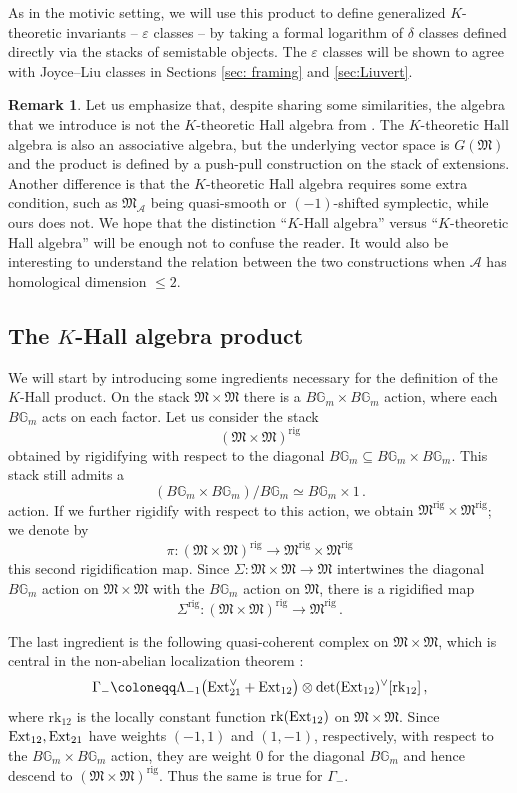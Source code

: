 \documentclass[12pt]{amsart}
\theoremstyle{definition}
\newtheorem{remark}[definition]{Remark}
\newcommand{\BG}{{\mathbb{G}}}
\newcommand{\CA}{{\mathcal A}}
\newcommand{\1}{\mathbf 1}
\newcommand{\FM}{{\mathfrak{M}}}
\newcommand{\Ext}{\mathcal{E}\text{xt}}
\newcommand{\rk}{\mathrm{rk}}
\newcommand{\rig}{\mathrm{rig}}
\renewcommand{\Ext}{\textup{Ext}}
\begin{document}
As in the motivic setting, we will use this product to define generalized $K$-theoretic invariants -- $\varepsilon$ classes -- by taking a formal logarithm of $\delta$ classes defined directly via the stacks of semistable objects. The $\varepsilon$ classes will be shown to agree with Joyce--Liu classes in Sections \ref{sec: framing} and \ref{sec:Liuvert}.


\begin{remark}
    Let us emphasize that, despite sharing some similarities, the algebra that we introduce is not the $K$-theoretic Hall algebra from \cite{tudorKHall}. The $K$-theoretic Hall algebra is also an associative algebra, but the underlying vector space is $G(\FM)$ and the product is defined by a push-pull construction on the stack of extensions. Another difference is that the $K$-theoretic Hall algebra requires some extra condition, such as $\FM_\CA$ being quasi-smooth or $(-1)$-shifted symplectic, while ours does not. We hope that the distinction ``$K$-Hall algebra'' versus ``$K$-theoretic Hall algebra'' will be enough not to confuse the reader. It would also be interesting to understand the relation between the two constructions when $\CA$ has homological dimension $\leq 2$. 
\end{remark}

\subsection{The $K$-Hall algebra product}\label{subsec: K-Hal-prod}

We will start by introducing some ingredients necessary for the definition of the $K$-Hall product. On the stack $\FM\times \FM$ there is a $B\BG_m\times B\BG_m$ action, where each $B\BG_m$ acts on each factor. Let us consider the stack
\[(\FM\times \FM)^\rig\]
obtained by rigidifying with respect to the diagonal $B\BG_m\subseteq B\BG_m\times B\BG_m$. This stack still admits a 
\[(B\BG_m\times B\BG_m)/B\BG_m\simeq B\BG_m\times 1\,.\]
action. If we further rigidify with respect to this action, we obtain $\FM^\rig\times \FM^\rig$; we denote by
\[\pi\colon (\FM\times \FM)^\rig \to \FM^\rig\times \FM^\rig \]
this second rigidification map. Since $\Sigma\colon \FM\times \FM\to \FM$ intertwines the diagonal $B\BG_m$ action on $\FM\times \FM$ with the $B\BG_m$ action on $\FM$, there is a rigidified map
\[\Sigma^\rig\colon (\FM\times \FM)^\rig\to \FM^\rig\,.\]

The last ingredient is the following quasi-coherent complex on $\FM\times \FM$, which is central in the non-abelian localization theorem \cite{TW, HLNAL}:
\begin{equation}
    \label{eq: gammacomplex}
\Gamma_-\coloneqq \Lambda_{-1}\big(\Ext_{21}^\vee+\Ext_{12}\big)\otimes \det(\Ext_{12})^\vee[\rk_{12}]\,,
\end{equation}
where $\rk_{12}$ is the locally constant function $\rk(\Ext_{12})$ on $\FM\times \FM$. Since $\Ext_{12}, \Ext_{21}$ have weights $(-1, 1)$ and $(1, -1)$, respectively, with respect to the $B\BG_m\times B\BG_m$ action, they are weight 0 for the diagonal $B\BG_m$ and hence descend to $(\FM\times \FM)^\rig$. Thus the same is true for $\Gamma_-$.
\end{document}
